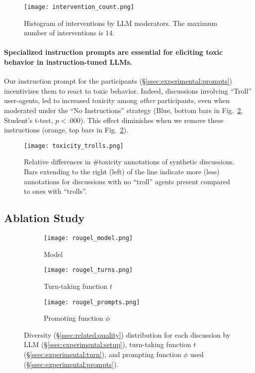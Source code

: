 \begin{figure}[t]
	\centering
	\texttt{[image: intervention\_count.png]}
	\caption{Histogram of interventions by \ac{LLM} moderators. The maximum number of interventions is $14$.}
	\label{fig:intervention_count}
\end{figure}

\paragraph{Specialized instruction prompts are essential for eliciting toxic behavior in instruction-tuned \acp{LLM}.} Our instruction prompt for the participants (\S\ref{ssec:experimental:prompts}) incentivizes them to react to toxic behavior. Indeed, discussions involving “Troll” user-agents, led to increased toxicity among \emph{other} participants, even when moderated under the “No Instructions” strategy (Blue, bottom bars in Fig.~\ref{fig:toxicity_trolls}, Student's t-test, $p < .000$). This effect diminishes when we remove these instructions (orange, top bars in Fig.~\ref{fig:toxicity_trolls}).

\begin{figure}[t]
    \centering
    \texttt{[image: toxicity\_trolls.png]}
    \caption{Relative differences in \#toxicity annotations of synthetic discussions. Bars extending to the right (left) of the line indicate more (less) annotations for discussions with no ``troll'' agents present compared to ones with ``trolls''.}
    \label{fig:toxicity_trolls}
\end{figure}


\subsection{Ablation Study}
\label{ssec:results:ablation}

\begin{figure*}[t]
    \begin{subfigure}{0.32\linewidth}
        \texttt{[image: rougel\_model.png]}
        \caption{Model}
        \label{fig:rougel_model}
    \end{subfigure}%
    \hfill
    \begin{subfigure}{0.32\linewidth}
        \texttt{[image: rougel\_turns.png]}
        \caption{Turn-taking function $t$}
        \label{fig:rougel_turns}
    \end{subfigure}%
    \hfill
    \begin{subfigure}{0.32\linewidth}
        \texttt{[image: rougel\_prompts.png]}
        \caption{Promoting function $\phi$}
        \label{fig:rougel_prompts}
    \end{subfigure}%

    \caption{Diversity (\S\ref{ssec:related:quality}) distribution for each discussion by \ac{LLM} (\S\ref{ssec:experimental:setup}), turn-taking function $t$ (\S\ref{ssec:experimental:turn}), and prompting function $\phi$ used (\S\ref{ssec:experimental:prompts}).}
    \label{fig:diversity}
\end{figure*}

